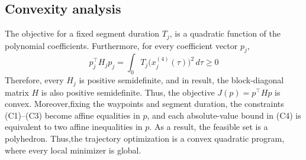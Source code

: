 \subsection{Convexity analysis}
The objective for a fixed segment duration \(T_j\), is a quadratic function of the polynomial coefficients. Furthermore, for every coefficient vector \(p_j\),
\[
    p_j^\top H_j p_j
    =\int_0{T_j} \bigl(x_j^{(4)}(\tau)\bigr)^2\,d\tau \geq 0
\]
Therefore, every \(H_j\) is positive semidefinite, and  in result, the block-diagonal matrix \(H\) is also positive semidefinite. Thus, the objective \(J(p)=p^\top Hp\) is convex. Moreover,fixing the waypoints and segment duration, the constraints (C1)--(C3) become affine equalities in \(p\), and each absolute-value bound in (C4) is equivalent to two affine inequalities in \(p\). As a result,  the feasible set is a polyhedron. Thus,the trajectory optimization is a convex quadratic program, where every local minimizer is global.

